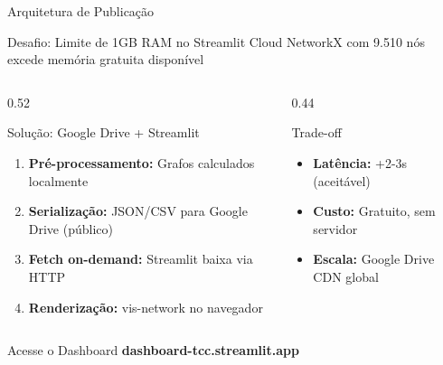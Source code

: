 \begin{frame}{Arquitetura de Publicação}
    \begin{block}{Desafio: Limite de 1GB RAM no Streamlit Cloud}
        \footnotesize
        NetworkX com 9.510 nós excede memória gratuita disponível
    \end{block}

    \vspace{0.15cm}

    \begin{columns}[T]
        \begin{column}{0.52\textwidth}
            \begin{block}{Solução: Google Drive + Streamlit}
                \footnotesize
                \begin{enumerate}
                    \item \textbf{Pré-processamento:} Grafos calculados localmente
                    \item \textbf{Serialização:} JSON/CSV para Google Drive (público)
                    \item \textbf{Fetch on-demand:} Streamlit baixa via HTTP
                    \item \textbf{Renderização:} vis-network no navegador
                \end{enumerate}
            \end{block}
        \end{column}
        \begin{column}{0.44\textwidth}
            \begin{block}{Trade-off}
                \footnotesize
                \begin{itemize}
                    \item \textbf{Latência:} +2-3s (aceitável)
                    \item \textbf{Custo:} Gratuito, sem servidor
                    \item \textbf{Escala:} Google Drive CDN global
                \end{itemize}
            \end{block}
        \end{column}
    \end{columns}

    \vspace{0.2cm}

    \begin{alertblock}{\centering Acesse o Dashboard}
        \footnotesize
        \centering
        \textbf{\large dashboard-tcc.streamlit.app}
    \end{alertblock}
\end{frame}
